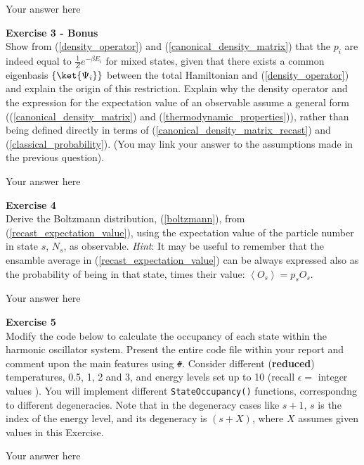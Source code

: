 \documentclass{article}
\begin{document}
Your answer here

\begin{mdframed}
\textbf{Exercise 3 - Bonus}\\
Show from (\ref{density_operator}) and (\ref{canonical_density_matrix}) that the $p_i$ are indeed equal to $\frac{1}{Z}e^{ -\beta E_i}$ for mixed states, given that there exists a common eigenbasis $\left\{\ket{\Psi_i}\right\}$ between the total Hamiltonian and (\ref{density_operator}) and explain the origin of this restriction.
Explain why the density operator and the expression for the expectation value of an observable assume a general form ((\ref{canonical_density_matrix}) and (\ref{thermodynamic_properties})), rather than being defined directly in terms of (\ref{canonical_density_matrix_recast}) and (\ref{classical_probability}).
(You may link your answer to the assumptions made in the previous question).
\end{mdframed}

Your answer here

\begin{mdframed}
\textbf{Exercise 4}\\
Derive the Boltzmann distribution, (\ref{boltzmann}), from (\ref{recast_expectation_value}), using the   expectation value of the particle number in state $s$, $N_s$, as observable.
\textit{Hint}: It may be useful to remember that the ensamble average in (\ref{recast_expectation_value}) can be always expressed also as the probability of being in that state, times their value: $\left< O_s \right> = p_s O_s$.
\end{mdframed}

Your answer here

\begin{mdframed}
\textbf{Exercise 5}\\
Modify the code below to calculate the occupancy of each state within the harmonic oscillator system.
Present the entire code file within your report and comment upon the main features using \texttt{\#}.
Consider different (\textbf{reduced}) temperatures, 0.5, 1, 2 and 3, and energy levels set up to 10 (recall $\epsilon =$ integer values ).
You will implement different \texttt{StateOccupancy()} functions, correspondng to different degeneracies. Note that in the degeneracy cases like $s+1$, $s$ is
the index of the energy level, and its degeneracy is $(s + X)$, where $X$ assumes given values in this Exercise.
\end{mdframed}

Your answer here
\end{document}
